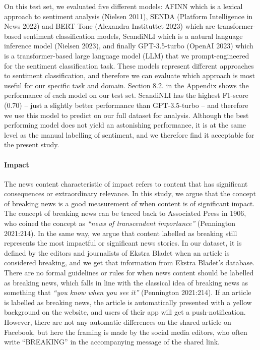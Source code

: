 \documentclass[
]{article}
\begin{document}
On this test set, we evaluated five different models: AFINN which is a
lexical approach to sentiment analysis (Nielsen 2011), SENDA (Platform
Intelligence in News 2022) and BERT Tone (Alexandra Instituttet 2023)
which are transformer-based sentiment classification models, ScandiNLI
which is a natural language inference model (Nielsen 2023), and finally
GPT-3.5-turbo (OpenAI 2023) which is a transformer-based large language
model (LLM) that we prompt-engineered for the sentiment classification
task. These models represent different approaches to sentiment
classification, and therefore we can evaluate which approach is most
useful for our specific task and domain. Section 8.2. in the Appendix
shows the performance of each model on our test set. ScandiNLI has the
highest F1-score (0.70) -- just a slightly better performance than
GPT-3.5-turbo -- and therefore we use this model to predict on our full
dataset for analysis. Although the best performing model does not yield
an astonishing performance, it is at the same level as the manual
labelling of sentiment, and we therefore find it acceptable for the
present study.

\hypertarget{impact}{%
\paragraph*{Impact}\label{impact}}

\hspace{-2.5em}

\noindent The news content characteristic of impact refers to content
that has significant consequences or extraordinary relevance. In this
study, we argue that the concept of breaking news is a good measurement
of when content is of significant impact. The concept of breaking news
can be traced back to Associated Press in 1906, who coined the concept
as \emph{``news of transcendent importance''} (Pennington 2021:214). In
the same way, we argue that content labelled as breaking still
represents the most impactful or significant news stories. In our
dataset, it is defined by the editors and journalists of Ekstra Bladet
when an article is considered breaking, and we get that information from
Ekstra Bladet's database. There are no formal guidelines or rules for
when news content should be labelled as breaking news, which falls in
line with the classical idea of breaking news as something that
\emph{``you know when you see it''} (Pennington 2021:214). If an article
is labelled as breaking news, the article is automatically presented
with a yellow background on the website, and users of their app will get
a push-notification. However, there are not any automatic differences on
the shared article on Facebook, but here the framing is made by the
social media editors, who often write ``BREAKING'' in the accompanying
message of the shared link.
\end{document}
